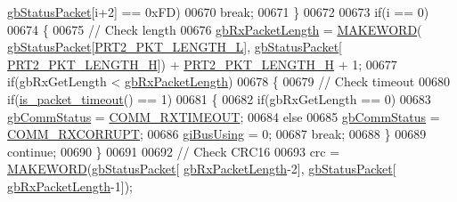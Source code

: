 \begin{DoxyCode}
      \hyperlink{classdynamixel2_a0776f210a190cf57d1a6faf9697a593d}{gbStatusPacket}[i+2] == 0xFD)
00670                     \textcolor{keywordflow}{break};
00671             \}
00672 
00673             \textcolor{keywordflow}{if}(i == 0)
00674             \{
00675                 \textcolor{comment}{// Check length}
00676                 \hyperlink{classdynamixel2_a7ae9bffcc9f4b087c57640881ccbb378}{gbRxPacketLength} = \hyperlink{dynamixel_8h_a6b98c16b8e3e7733dd4063d0b0fac24c}{MAKEWORD}(
      \hyperlink{classdynamixel2_a0776f210a190cf57d1a6faf9697a593d}{gbStatusPacket}[\hyperlink{dynamixel_8h_a9e77ab568957b64786c810967dec8b0c}{PRT2\_PKT\_LENGTH\_L}], \hyperlink{classdynamixel2_a0776f210a190cf57d1a6faf9697a593d}{gbStatusPacket}[
      \hyperlink{dynamixel_8h_a5ea18a21d722bf72217d5408c4d2a868}{PRT2\_PKT\_LENGTH\_H}]) + \hyperlink{dynamixel_8h_a5ea18a21d722bf72217d5408c4d2a868}{PRT2\_PKT\_LENGTH\_H} + 1;
00677                 \textcolor{keywordflow}{if}(gbRxGetLength < \hyperlink{classdynamixel2_a7ae9bffcc9f4b087c57640881ccbb378}{gbRxPacketLength})
00678                 \{
00679                     \textcolor{comment}{// Check timeout}
00680                     \textcolor{keywordflow}{if}(\hyperlink{classdynamixel2_a4c996c0d9edcfd320906674512837a9e}{is\_packet\_timeout}() == 1)
00681                     \{
00682                         \textcolor{keywordflow}{if}(gbRxGetLength == 0)
00683                             \hyperlink{classdynamixel2_a703e327ba8ec5909c238dc94a00cb32d}{gbCommStatus} = \hyperlink{dynamixel_8h_af9976398353d104bb8a78b1f02f9fceb}{COMM\_RXTIMEOUT};
00684                         \textcolor{keywordflow}{else}
00685                             \hyperlink{classdynamixel2_a703e327ba8ec5909c238dc94a00cb32d}{gbCommStatus} = \hyperlink{dynamixel_8h_a93c30bd345d8077112f0a3524d26278b}{COMM\_RXCORRUPT};
00686                         \hyperlink{classdynamixel2_a7fc43b4c4b7e36aa8f0420b037658f83}{giBusUsing} = 0;
00687                         \textcolor{keywordflow}{break};
00688                     \}
00689                     \textcolor{keywordflow}{continue};
00690                 \}
00691 
00692                 \textcolor{comment}{// Check CRC16}
00693                 crc = \hyperlink{dynamixel_8h_a6b98c16b8e3e7733dd4063d0b0fac24c}{MAKEWORD}(\hyperlink{classdynamixel2_a0776f210a190cf57d1a6faf9697a593d}{gbStatusPacket}[
      \hyperlink{classdynamixel2_a7ae9bffcc9f4b087c57640881ccbb378}{gbRxPacketLength}-2], \hyperlink{classdynamixel2_a0776f210a190cf57d1a6faf9697a593d}{gbStatusPacket}[
      \hyperlink{classdynamixel2_a7ae9bffcc9f4b087c57640881ccbb378}{gbRxPacketLength}-1]);

\end{DoxyCode}
